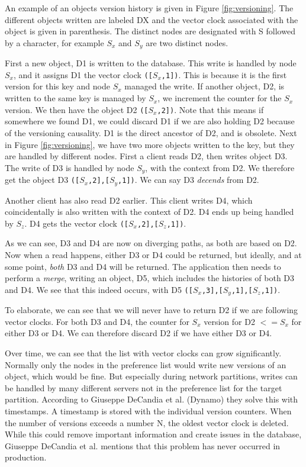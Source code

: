 An example of an objects version history is given in Figure \ref{fig:versioning}. 
The different objects written are labeled DX and the vector clock associated with the object is given in parenthesis. The distinct nodes are designated with S followed by a character, for example $S_x$ and $S_y$ are two distinct nodes.

First a new object, D1 is written to the database. This write is handled by node $S_x$, and it assigns D1 the vector clock \texttt{([$S_x$,1])}.
This is because it is the first version for this key and node $S_x$ managed the write. If another object, D2, is written to the same key is managed by $S_x$, we increment the counter for the $S_x$ version. We then have the object D2 \texttt{([$S_x$,2])}. Note that this means if somewhere we found D1, we could discard D1 if we are also holding D2 because of the versioning causality. D1 is the direct ancestor of D2, and is obsolete.
Next in Figure \ref{fig:versioning}, we have two more objects written to the key, but they are handled by different nodes.
First a client reads D2, then writes object D3. The write of D3 is handled by node $S_y$, with the context from D2. We therefore get the object D3 \texttt{([$S_x$,2],[$S_y$,1])}. We can say D3 \emph{decends} from D2.

Another client has also read D2 earlier. This client writes D4, which coincidentally is also written with the context of D2. D4 ends up being handled by $S_z$. D4 gets the vector clock \texttt{([$S_x$,2],[$S_z$,1])}.

As we can see, D3 and D4 are now on diverging paths, as both are based on D2.
Now when a read happens, either D3 or D4 could be returned, but ideally, and at some point, \emph{both} D3 and D4 will be returned.
The application then needs to perform a \emph{merge}, writing an object, D5, which includes the histories of both D3 and D4.
We see that this indeed occurs, with D5 \texttt{([$S_x$,3],[$S_y$,1],[$S_z$,1])}.

To elaborate, we can see that we will never have to return D2 if we are following vector clocks.
For both D3 and D4, the counter for $S_x$ version for D2 $<= S_x$ for either D3 or D4. We can therefore discard D2 if we have either D3 or D4.

Over time, we can see that the list with vector clocks can grow significantly. Normally only the nodes in the preference list would write new versions of an object, which would be fine. But especially during network partitions, writes can be handled by many different servers not in the preference list for the target partition.
According to Giuseppe DeCandia et al. (Dynamo)\cite{dynamo} they solve this with timestamps. A timestamp is stored with the individual version counters. 
When the number of versions exceeds a number N, the oldest vector clock is deleted.
While this could remove important information and create issues in the database, Giuseppe DeCandia et al.\cite{dynamo} mentions that this problem has never occurred in production.

